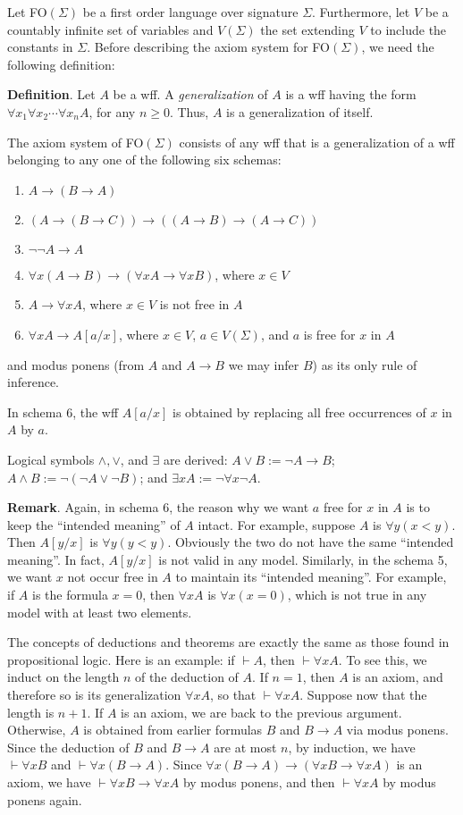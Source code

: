 \documentclass[12pt]{article}
\begin{document}
Let FO$(\Sigma)$ be a first order language over signature $\Sigma$.  Furthermore, let $V$ be a countably infinite set of variables and $V(\Sigma)$ the set extending $V$ to include the constants in $\Sigma$.  Before describing the axiom system for FO$(\Sigma)$, we need the following definition:

\textbf{Definition}.  Let $A$ be a wff.  A \emph{generalization} of $A$ is a wff having the form $\forall x_1 \forall x_2 \cdots \forall x_n A$, for any $n\ge 0$.  Thus, $A$ is a generalization of itself.

The axiom system of FO$(\Sigma)$ consists of any wff that is a generalization of a wff belonging to any one of the following six schemas:
\begin{enumerate}
\item $A\to (B\to A)$
\item $(A\to (B\to C)) \to ((A\to B)\to (A\to C))$
\item $\neg \neg A \to A$
\item $\forall x (A\to B) \to (\forall x A \to \forall x B)$, where $x\in V$
\item $A\to \forall x A$, where $x\in V$ is not free in $A$
\item $\forall x A \to A[a/x]$, where $x\in V$, $a\in V(\Sigma)$, and $a$ is free for $x$ in $A$
\end{enumerate}
and modus ponens (from $A$ and $A\to B$ we may infer $B$) as its only rule of inference.

In schema 6, the wff $A[a/x]$ is obtained by replacing all free occurrences of $x$ in $A$ by $a$.  

Logical symbols $\land,\lor$, and $\exists$ are derived: $A\lor B:=\neg A\to B$; $A\land B:=\neg (\neg A\lor \neg B)$; and $\exists x A:=\neg \forall x \neg A$.

\textbf{Remark}.  Again, in schema 6, the reason why we want $a$ free for $x$ in $A$ is to keep the ``intended meaning'' of $A$ intact.  For example, suppose $A$ is $\forall y (x < y)$.  Then $A[y/x]$ is $\forall y (y < y)$.  Obviously the two do not have the same ``intended meaning''.  In fact, $A[y/x]$ is not valid in any model.  Similarly, in the schema 5, we want $x$ not occur free in $A$ to maintain its ``intended meaning''.  For example, if $A$ is the formula $x=0$, then $\forall x A$ is $\forall x (x=0)$, which is not true in any model with at least two elements.

The concepts of deductions and theorems are exactly the same as those found in propositional logic.  Here is an example: if $\vdash A$, then $\vdash \forall x A$.  To see this, we induct on the length $n$ of the deduction of $A$.  If $n=1$, then $A$ is an axiom, and therefore so is its generalization $\forall x A$, so that $\vdash \forall x A$. Suppose now that the length is $n+1$.  If $A$ is an axiom, we are back to the previous argument.  Otherwise, $A$ is obtained from earlier formulas $B$ and $B\to A$ via modus ponens.  Since the deduction of $B$ and $B\to A$ are at most $n$, by induction, we have $\vdash \forall x B$ and $\vdash \forall x (B\to A)$.  Since $\forall x (B\to A) \to (\forall x B \to \forall x A)$ is an axiom, we have $\vdash \forall x B \to \forall x A$ by modus ponens, and then $\vdash \forall x A$ by modus ponens again.
\end{document}
